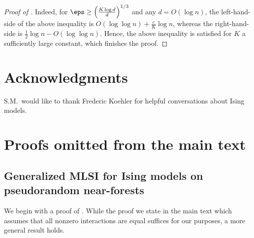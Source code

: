 \documentclass[11pt,letterpaper]{article}
\begin{document}
\begin{proof}[Proof of ]
    Indeed, for $\eps \ge \left(\frac{K \log d}{d}\right)^{1/3}$ and any $d = O(\log n)$, the left-hand-side of the above inequality is $O(\log\log n) + \frac{c}{K} \log n$, whereas the right-hand-side is $\frac{1}{2}\log n - O(\log \log n)$. 
    Hence, the above inequality is satisfied for $K$ a sufficiently large constant, which finishes the proof.  
\end{proof}

\section*{Acknowledgments}
S.M.\ would like to thank Frederic Koehler for helpful conversations about Ising models.

\clearpage





\appendix

\section{Proofs omitted from the main text}
\label{appendix-a}

\subsection{Generalized MLSI for Ising models on pseudorandom near-forests}

We begin with a proof of . While the proof we state in the main text which assumes that all nonzero interactions are equal suffices for our purposes, a more general result holds.

\pseudorandomferromixing*
\end{document}
